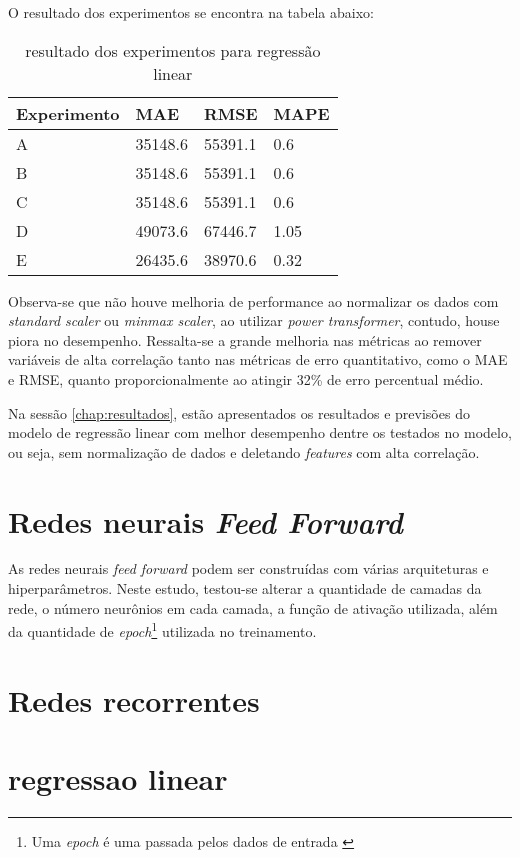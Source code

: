 O resultado dos experimentos se encontra na tabela abaixo:

\begin{table}[H]
    \begin{tabular}{llll}
        \toprule
        Experimento & MAE     & RMSE    & MAPE \\
        \midrule
        A           & 35148.6 & 55391.1 & 0.6  \\
        B           & 35148.6 & 55391.1 & 0.6  \\
        C           & 35148.6 & 55391.1 & 0.6  \\
        D           & 49073.6 & 67446.7 & 1.05 \\
        E           & 26435.6 & 38970.6 & 0.32 \\
        \bottomrule
    \end{tabular}
    \caption{resultado dos experimentos para regressão linear}
\end{table}

Observa-se que não houve melhoria de performance ao normalizar 
os dados com \textit{standard scaler} ou \textit{minmax scaler},
ao utilizar \textit{power transformer}, contudo, house piora 
no desempenho. Ressalta-se a grande melhoria nas métricas ao 
remover variáveis de alta correlação tanto nas métricas de erro 
quantitativo, como o MAE e RMSE, quanto proporcionalmente ao 
atingir 32\% de erro percentual médio.

Na sessão \ref{chap:resultados}, estão apresentados os 
resultados e previsões do modelo de regressão linear com
melhor desempenho dentre os testados no modelo, ou seja, sem 
normalização de dados e deletando \textit{features} com alta 
correlação.

\section{Redes neurais \textit{Feed Forward}}

As redes neurais \textit{feed forward} podem ser construídas
com várias arquiteturas e hiperparâmetros. Neste estudo, testou-se
alterar a quantidade de camadas da rede, o número neurônios em 
cada camada, a função de ativação utilizada, além da quantidade
de \textit{epoch}\footnote{Uma \textit{epoch} é uma passada 
pelos dados de entrada \cite{dl-oreilly}} utilizada no treinamento.



\section{Redes recorrentes}
\section{regressao linear}